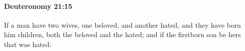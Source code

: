 
		\paragraph{Deuteronomy 21:15} %
			\label{DEUTERONOMY-21-15}

			If a man have two wives, one beloved, and another hated, and they have born him children, both the beloved and the hated; and if the firstborn son be hers that was hated:



